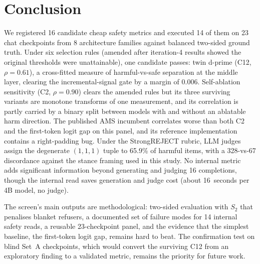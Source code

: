 \documentclass[11pt,letterpaper]{article}
\begin{document}
\section{Conclusion}

We registered 16 candidate cheap safety metrics and executed 14 of them
on 23 chat checkpoints from 8 architecture families against balanced
two-sided ground truth. Under six selection rules (amended after
iteration-4 results showed the original thresholds were unattainable),
one candidate passes: twin d-prime (C12, $\rho = 0.61$), a cross-fitted
measure of harmful-vs-safe separation at the middle layer, clearing the
incremental-signal gate by a margin of 0.006. Self-ablation sensitivity
(C2, $\rho = 0.90$) clears the amended rules but its three surviving
variants are monotone transforms of one measurement, and its correlation
is partly carried by a binary split between models with and without an
ablatable harm direction. The published AMS incumbent
\citep{Messenger2026} correlates worse than both C2 and the first-token
logit gap on this panel, and its reference implementation contains a
right-padding bug. Under the StrongREJECT rubric, LLM judges assign the
degenerate $(1,1,1)$ tuple to 65.9\% of harmful items, with a
328-vs-67 discordance against the stance framing used in this study. No
internal metric adds significant information beyond generating and
judging 16 completions, though the internal read saves generation and
judge cost (about 16~seconds per 4B model, no judge).

The screen's main outputs are methodological: two-sided evaluation with
$S_2$ that penalises blanket refusers, a documented set of failure modes
for 14 internal safety reads, a reusable 23-checkpoint panel, and the
evidence that the simplest baseline, the first-token logit gap, remains
hard to beat. The confirmation test on blind Set~A checkpoints, which
would convert the surviving C12 from an exploratory finding to a
validated metric, remains the priority for future work.



\end{document}
